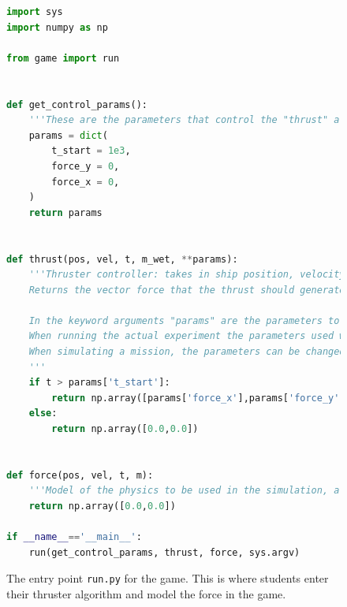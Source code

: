 \documentclass[11pt, twocolumn]{article}
\begin{document}
\begin{figure}
    \centering
\begin{lstlisting}[language=Python]
import sys
import numpy as np

from game import run


def get_control_params():
    '''These are the parameters that control the "thrust" algorithm. They will appear as float variables in the simulation.'''
    params = dict(
        t_start = 1e3,
        force_y = 0,
        force_x = 0,
    )
    return params


def thrust(pos, vel, t, m_wet, **params):
    '''Thruster controller: takes in ship position, velocity, time and the current fuel mass.
    Returns the vector force that the thrust should generate for that time.

    In the keyword arguments "params" are the parameters to control the algorithm.
    When running the actual experiment the parameters used will be fetched from "get_control_params".
    When simulating a mission, the parameters can be changed on the fly since it is a simulation.
    '''
    if t > params['t_start']:
        return np.array([params['force_x'],params['force_y']])
    else:
        return np.array([0.0,0.0])


def force(pos, vel, t, m):
    '''Model of the physics to be used in the simulation, a function of position, velocity, time and mass of the object experiencing the force.'''
    return np.array([0.0,0.0])

if __name__=='__main__':
    run(get_control_params, thrust, force, sys.argv)
\end{lstlisting}
    \caption{The entry point \texttt{run.py} for the game. This is where students enter their thruster algorithm and model the force in the game.}
    \label{fig:run}
\end{figure}
\end{document}
